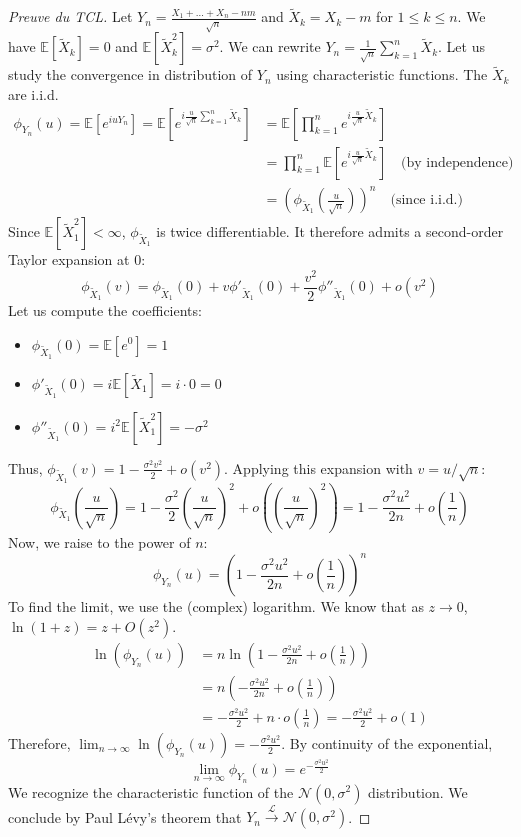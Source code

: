 \begin{proof}[Preuve du TCL]
Let $Y_n = \frac{X_1 + \dots + X_n - nm}{\sqrt{n}}$ and $\tilde{X}_k = X_k - m$ for $1 \leq k \leq n$. We have $\mathbb{E}[\tilde{X}_k] = 0$ and $\mathbb{E}[\tilde{X}_k^2] = \sigma^2$. We can rewrite $Y_n = \frac{1}{\sqrt{n}} \sum_{k=1}^n \tilde{X}_k$. Let us study the convergence in distribution of $Y_n$ using characteristic functions. The $\tilde{X}_k$ are i.i.d.
\begin{align*}
    \phi_{Y_n}(u) = \mathbb{E}\left[ e^{iu Y_n} \right] = \mathbb{E}\left[ e^{i \frac{u}{\sqrt{n}} \sum_{k=1}^n \tilde{X}_k} \right] &= \mathbb{E}\left[ \prod_{k=1}^n e^{i \frac{u}{\sqrt{n}} \tilde{X}_k} \right] \\
    &= \prod_{k=1}^n \mathbb{E}\left[ e^{i \frac{u}{\sqrt{n}} \tilde{X}_k} \right] \quad \text{(by independence)} \\
    &= \left( \phi_{\tilde{X}_1}\left(\frac{u}{\sqrt{n}}\right) \right)^n \quad \text{(since i.i.d.)}
\end{align*}
Since $\mathbb{E}[\tilde{X}_1^2] < \infty$, $\phi_{\tilde{X}_1}$ is twice differentiable. It therefore admits a second-order Taylor expansion at 0:
\[ \phi_{\tilde{X}_1}(v) = \phi_{\tilde{X}_1}(0) + v \phi'_{\tilde{X}_1}(0) + \frac{v^2}{2} \phi''_{\tilde{X}_1}(0) + o(v^2) \]
Let us compute the coefficients:
\begin{itemize}
    \item $\phi_{\tilde{X}_1}(0) = \mathbb{E}[e^0] = 1$
    \item $\phi'_{\tilde{X}_1}(0) = i \mathbb{E}[\tilde{X}_1] = i \cdot 0 = 0$
    \item $\phi''_{\tilde{X}_1}(0) = i^2 \mathbb{E}[\tilde{X}_1^2] = - \sigma^2$
\end{itemize}
Thus, $\phi_{\tilde{X}_1}(v) = 1 - \frac{\sigma^2 v^2}{2} + o(v^2)$. Applying this expansion with $v = u/\sqrt{n}$:
\[ \phi_{\tilde{X}_1}\left(\frac{u}{\sqrt{n}}\right) = 1 - \frac{\sigma^2}{2} \left(\frac{u}{\sqrt{n}}\right)^2 + o\left(\left(\frac{u}{\sqrt{n}}\right)^2\right) = 1 - \frac{\sigma^2 u^2}{2n} + o\left(\frac{1}{n}\right) \]
Now, we raise to the power of $n$:
\[ \phi_{Y_n}(u) = \left( 1 - \frac{\sigma^2 u^2}{2n} + o\left(\frac{1}{n}\right) \right)^n \]
To find the limit, we use the (complex) logarithm. We know that as $z \to 0$, $\ln(1+z) = z + O(z^2)$.
\begin{align*}
    \ln(\phi_{Y_n}(u)) &= n \ln\left( 1 - \frac{\sigma^2 u^2}{2n} + o\left(\frac{1}{n}\right) \right) \\
    &= n \left( -\frac{\sigma^2 u^2}{2n} + o\left(\frac{1}{n}\right) \right) \\
    &= -\frac{\sigma^2 u^2}{2} + n \cdot o\left(\frac{1}{n}\right) = -\frac{\sigma^2 u^2}{2} + o(1)
\end{align*}
Therefore, $\lim_{n \to \infty} \ln(\phi_{Y_n}(u)) = -\frac{\sigma^2 u^2}{2}$. By continuity of the exponential,
\[ \lim_{n \to \infty} \phi_{Y_n}(u) = e^{-\frac{\sigma^2 u^2}{2}} \]
We recognize the characteristic function of the $\mathcal{N}(0, \sigma^2)$ distribution. We conclude by Paul Lévy's theorem that $Y_n \xrightarrow{\mathcal{L}} \mathcal{N}(0, \sigma^2)$.
\end{proof}
